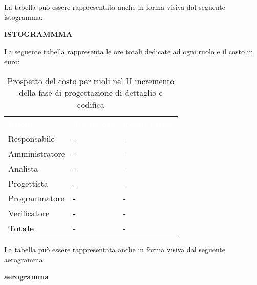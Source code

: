 La tabella può essere rappresentata anche in forma visiva dal seguente istogramma:

\textbf{ISTOGRAMMMA}


La seguente tabella rappresenta le ore totali dedicate ad ogni ruolo e il costo in euro:

\begin{table}[!htbp]
\begin{center}
\renewcommand{\arraystretch}{1.5}
\begin{tabular}{ m{}<{\centering}  m{}<{\centering} m{}<{\centering}}
	\rowcolor{darkblue}
	\textcolor{white}{\textbf{Ruolo}}&\textcolor{white}{\textbf{Totale ore}}&\textcolor{white}{\textbf{Costo totale}}\\ 

	Responsabile  & - & - \\	

	Amministratore & - & - \\
	
	Analista & - & - \\
	
	Progettista & - & - \\
	
	Programmatore & - & - \\
	
	Verificatore & - & - \\
	
	\textbf{Totale} & - & - \\
	
\end{tabular}
\caption{Prospetto del costo per ruoli nel II incremento della fase di progettazione di dettaglio e codifica}
\end{center}
\end{table}

La tabella può essere rappresentata anche in forma visiva dal seguente aerogramma:

\textbf{aerogramma}


